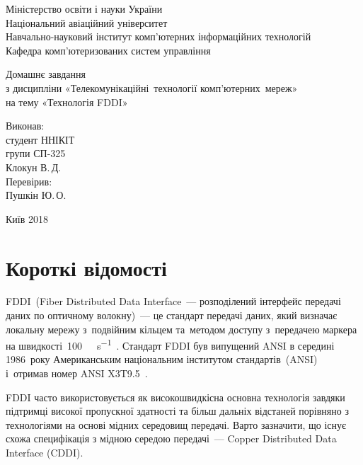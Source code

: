 \documentclass[
	a4paper,
	oneside,
	BCOR = 10mm,
	DIV = 12,
	12pt,
	headings = normal,
]{scrartcl}
\newcommand{\allcaps}[1]{{\addfontfeatures{LetterSpace = 8, Kerning = Off}#1}}
\begin{document}
\begin{titlepage}
		\begin{center}
			Міністерство освіти і науки України\\
			Національний авіаційний університет\\
			Навчально-науковий інститут комп'ютерних інформаційних технологій\\
			Кафедра комп'ютеризованих систем управління

			\vspace{\fill}
				Домашнє завдання\\
				з дисципліни «Телекомунікаційні~технології комп'ютерних~мереж»\\
				на тему «Технологія \textenglish{FDDI}»

			\vspace{\fill}

			\begin{flushright}
				Виконав:\\
				студент \allcaps{ННІКІТ}\\
				групи СП-325\\
				Клокун В.\,Д.\\
				Перевірив:\\
				Пушкін Ю.\,О.
			\end{flushright}

			Київ 2018
		\end{center}
	\end{titlepage}

	\section{Короткі відомості}
		\textenglish{FDDI}~(\textenglish{Fiber Distributed Data Interface~— розподілений інтерфейс передачі даних по оптичному волокну})~— це стандарт передачі даних, який визначає локальну мережу з~подвійним кільцем та~методом доступу з~передачею маркера на швидкості~\SI{100}{\mega\bit\per\second}~\cite{cisco-docwiki-fddi}. Стандарт \textenglish{FDDI} був випущений \textenglish{ANSI} в середині 1986~року Американським національним інститутом стандартів~(\textenglish{ANSI}) і~отримав номер \textenglish{ANSI X3T9.5}~\cite{wiki-uk-fddi}.
		
		\textenglish{FDDI} часто використовується як високошвидкісна основна технологія завдяки підтримці високої пропускної здатності та більш дальніх відстаней порівняно з технологіями на основі мідних середовищ передачі. Варто зазначити, що існує схожа специфікація з мідною середою передачі~— \textenglish{Copper Distributed Data Interface (CDDI)}.
\end{document}
